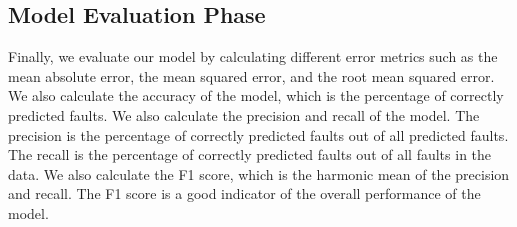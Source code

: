\subsection{Model Evaluation Phase}

Finally, we evaluate our model by calculating different error metrics such as the mean absolute error, the mean squared error, and the root mean squared error. We also calculate the accuracy of the model, which is the percentage of correctly predicted faults. We also calculate the precision and recall of the model. The precision is the percentage of correctly predicted faults out of all predicted faults. The recall is the percentage of correctly predicted faults out of all faults in the data. We also calculate the F1 score, which is the harmonic mean of the precision and recall. The F1 score is a good indicator of the overall performance of the model.
